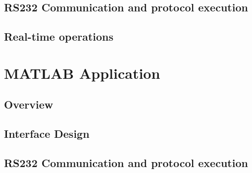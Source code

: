 \documentclass[14pt,fleqn]{book} %
\begin{document}
\section{RS232 Communication and protocol execution}

\section{Real-time operations}


\chapter{MATLAB\textregistered{} Application}

\section{Overview}

\section{Interface Design}

\section{RS232 Communication and protocol execution}




%






\end{document}
